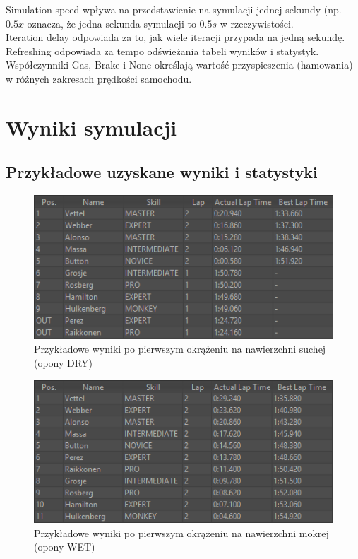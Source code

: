 \documentclass{article}
\begin{document}
Simulation speed wpływa na przedstawienie na symulacji jednej sekundy (np. $0.5x$ oznacza, że jedna sekunda symulacji to $0.5s$ w rzeczywistości. \\
Iteration delay odpowiada za to, jak wiele iteracji przypada na jedną sekundę. \\
Refreshing odpowiada za tempo odświeżania tabeli wyników i statystyk.\\

Współczynniki Gas, Brake i None określają wartość przyspieszenia (hamowania) w różnych zakresach prędkości samochodu.\\



\section{Wyniki symulacji}
\subsection{Przykładowe uzyskane wyniki i statystyki}

\begin{figure}[h]
\begin{center}
\includegraphics[scale=0.8]{results.png}
\caption{Przykładowe wyniki po pierwszym okrążeniu na nawierzchni suchej (opony DRY)}
\end{center}
\end{figure}

\begin{figure}[h]
\begin{center}
\includegraphics[scale=0.8]{wet.png}
\caption{Przykładowe wyniki po pierwszym okrążeniu na nawierzchni mokrej (opony WET)}
\end{center}
\end{figure}
\end{document}
